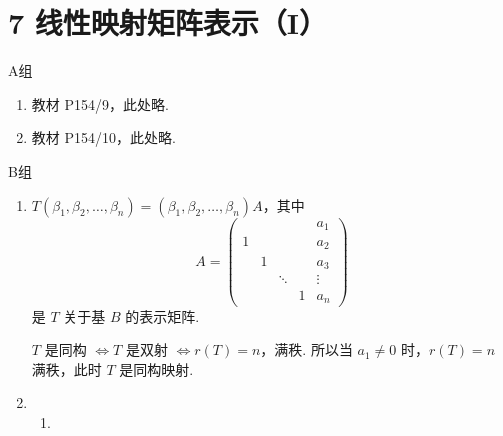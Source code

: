 \section*{7 线性映射矩阵表示（I）}

\vspace{2ex}

\centerline{\heiti A组}
\begin{enumerate}
    \item 教材 P154/9，此处略.
    \item 教材 P154/10，此处略.
\end{enumerate}

\centerline{\heiti B组}
\begin{enumerate}
    \item $ T(\beta_1, \beta_2, \ldots, \beta_n) = (\beta_1, \beta_2, \ldots, \beta_n)A $，其中
          \[ A = \begin{pmatrix}
                    &   &        &   & a_1    \\
                  1 &   &        &   & a_2    \\
                    & 1 &        &   & a_3    \\
                    &   & \ddots &   & \vdots \\
                    &   &        & 1 & a_n
              \end{pmatrix} \]
          是 $ T $ 关于基 $ B $ 的表示矩阵.

          $ T $ 是同构 $ \iff T $ 是双射 $ \iff r(T) = n $，满秩. 所以当 $ a_1 \neq 0 $ 时，$ r(T) = n $ 满秩，此时 $ T $ 是同构映射.

    \item \begin{enumerate}
              \item


\end{enumerate}
\end{enumerate}
